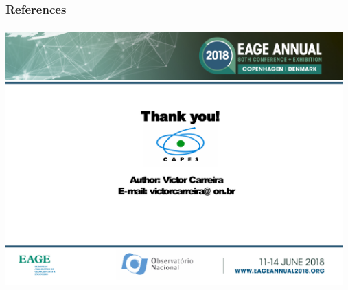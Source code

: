 \documentclass[aspectratio=10]{beamer} %
\begin{document}
\begin{frame}[allowframebreaks]
\frametitle{References}
\tiny


\end{frame}

\begin{frame}
\flushbottom
\setlength{\parskip}{-1ex plus 1ex }
\setlength{\parindent}{-15pt}
\includegraphics[width=13cm,height=10cm]{Imagens/end.pdf}
\end{frame}
\end{document}

